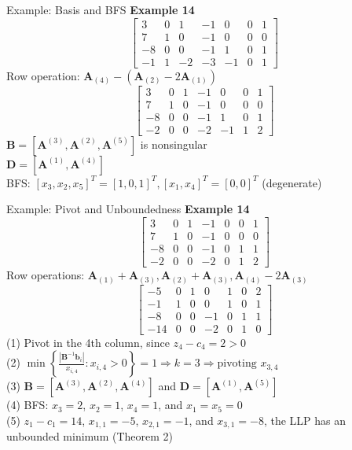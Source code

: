 \documentclass[aspectratio=169,hyperref,UTF8,CJK]{beamer}
\begin{document}
\begin{frame}{Example: Basis and BFS}
\textbf{Example 14}
\[
\begin{bmatrix}
3 & 0 & 1 & -1 & 0 & 0 & 1 \\
7 & 1 & 0 & -1 & 0 & 0 & 0 \\
-8 & 0 & 0 & -1 & 1 & 0 & 1 \\
-1 & 1 & -2 & -3 & -1 & 0 & 1
\end{bmatrix}
\]
Row operation: \(\mathbf{A}_{(4)} - (\mathbf{A}_{(2)} - 2\mathbf{A}_{(1)})\)
\[
\begin{bmatrix}
3 & 0 & 1 & -1 & 0 & 0 & 1 \\
7 & 1 & 0 & -1 & 0 & 0 & 0 \\
-8 & 0 & 0 & -1 & 1 & 0 & 1 \\
-2 & 0 & 0 & -2 & -1 & 1 & 2
\end{bmatrix}
\]
\(\mathbf{B} = [\mathbf{A}^{(3)}, \mathbf{A}^{(2)}, \mathbf{A}^{(5)}]\) is nonsingular \\
\(\mathbf{D} = [\mathbf{A}^{(1)}, \mathbf{A}^{(4)}]\) \\
BFS: \([x_3, x_2, x_5]^T = [1, 0, 1]^T, [x_1, x_4]^T = [0, 0]^T\) (degenerate)
\end{frame}

\begin{frame}{Example: Pivot and Unboundedness}
\textbf{Example 14}
\[
\begin{bmatrix}
3 & 0 & 1 & -1 & 0 & 0 & 1 \\
7 & 1 & 0 & -1 & 0 & 0 & 0 \\
-8 & 0 & 0 & -1 & 0 & 1 & 1 \\
-2 & 0 & 0 & -2 & 0 & 1 & 2
\end{bmatrix}
\]
Row operations: \(\mathbf{A}_{(1)}+\mathbf{A}_{(3)}, \mathbf{A}_{(2)}+\mathbf{A}_{(3)}, \mathbf{A}_{(4)}-2\mathbf{A}_{(3)}\)
\[
\begin{bmatrix}
-5 & 0 & 1 & 0 & 1 & 0 & 2 \\
-1 & 1 & 0 & 0 & 1 & 0 & 1 \\
-8 & 0 & 0 & -1 & 0 & 1 & 1 \\
-14 & 0 & 0 & -2 & 0 & 1 & 0
\end{bmatrix}
\]
(1) Pivot in the 4th column, since \(z_4 - c_4 = 2 > 0\) \\
(2) \(\min \left\{ \frac{|\mathbf{B}^{-1}\mathbf{b}_i|}{x_{i,4}} : x_{i,4} > 0 \right\} = 1 \Rightarrow k = 3 \Rightarrow \text{pivoting } x_{3,4}\) \\
(3) \(\mathbf{B} = [\mathbf{A}^{(3)}, \mathbf{A}^{(2)}, \mathbf{A}^{(4)}]\) and \(\mathbf{D} = [\mathbf{A}^{(1)}, \mathbf{A}^{(5)}]\) \\
(4) BFS: \(x_3 = 2\), \(x_2 = 1\), \(x_4 = 1\), and \(x_1 = x_5 = 0\) \\
(5) \(z_1 - c_1 = 14\), \(x_{1,1} = -5\), \(x_{2,1} = -1\), and \(x_{3,1} = -8\), the LLP has an unbounded minimum (Theorem 2)
\end{frame}
\end{document}
